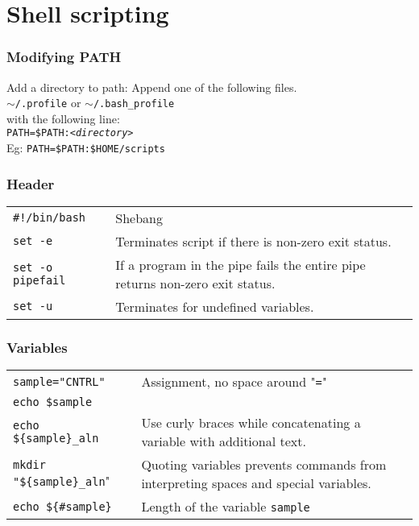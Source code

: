 \section{Shell scripting}
\subsubsection{Modifying PATH}
Add a directory to path: Append one of the following files.\\
\texttt{$\sim$/.profile} or \texttt{$\sim$/.bash\_profile}\\
with the following line:\\
\texttt{PATH=\$PATH:\textit{<directory>}}\\
Eg: \texttt{PATH=\$PATH:\$HOME/scripts}\\



\subsubsection{Header}

\begin{tabularx}{\linewidth}{lX}
\texttt{\#!/bin/bash} & Shebang\\
\texttt{set -e} & Terminates script if there is non-zero exit status.\\
\texttt{set -o pipefail} & If a program in the pipe fails the entire pipe returns non-zero exit status.\\
\texttt{set -u} & Terminates for undefined variables.\\
\end{tabularx}

\subsubsection{Variables}
\begin{tabularx}{\linewidth}{lX}
\texttt{sample="CNTRL"} & Assignment, no space around "\texttt{=}"\\
\texttt{echo \$sample} & \\
\texttt{echo \$\{sample\}\_aln} & Use curly braces while concatenating a variable with additional text.\\
\texttt{mkdir "\$\{sample\}\_aln}" & Quoting variables prevents commands from interpreting spaces and special variables.\\
\texttt{echo \$\{\#sample\}} & Length of the variable \texttt{sample}
\end{tabularx}

